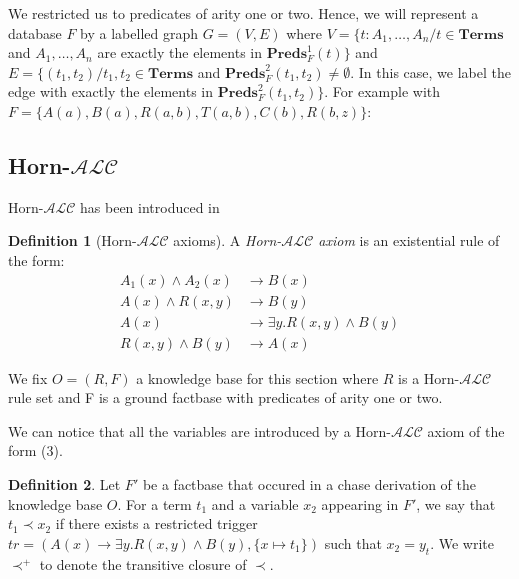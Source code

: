 \documentclass{article}
\theoremstyle{definition}
\newtheorem{definition}{Definition}[section]
\theoremstyle{remark}
\newcommand{\Terms}{\textbf{Terms}}
\newcommand{\Preds}{\textbf{Preds}}
\begin{document}
We restricted us to predicates of arity one or two. Hence, we will represent a database $F$ by a labelled graph $G = (V,E)$ where $V = \{t:A_1,\ldots,A_n /t \in \Terms$ and $A_1,\ldots,A_n$ are exactly the elements in $\Preds_F^1(t)\}$ and $E = \{(t_1,t_2) /t_1,t_2 \in \Terms$ and $\Preds^2_F(t_1,t_2) \neq \emptyset$. In this case, we label the edge with exactly the elements in $\Preds^2_F(t_1,t_2)\}$. For example with $F = \{A(a), B(a),R(a,b),T(a,b),C(b),R(b,z)\}$: \\



\subsection{Horn-$\mathcal{ALC}$ }

Horn-$\mathcal{ALC}$ has been introduced in \cite{Horn-ALC}

\begin{definition}[Horn-$\mathcal{ALC}$ axioms]
A \emph{Horn-$\mathcal{ALC}$ axiom} is an existential rule of the form:
\begin{align}
A_1(x) \wedge A_2(x) &\rightarrow B(x) \\
A(x) \wedge R(x,y) &\rightarrow B(y) \\
A(x) &\rightarrow \exists y.R(x,y) \wedge B(y) \\
R(x,y) \wedge B(y) &\rightarrow A(x)
\end{align}

\end{definition}


We fix $O=(R,F)$ a knowledge base for this section where $R$ is a Horn-$\mathcal{ALC}$ rule set and F is a ground factbase with predicates of arity one or two.

We can notice that all the variables are introduced by a Horn-$\mathcal{ALC}$ axiom of the form (3).

\begin{definition}
Let $F'$ be a factbase that occured in a chase derivation of the knowledge base $O$. For a term $t_1$ and a variable $x_2$ appearing in $F'$, we say that $t_1 \prec x_2$ if there exists a restricted trigger $tr = (A(x) \rightarrow \exists y.R(x,y) \wedge B(y), \{x \mapsto t_1\})$ such that $x_2 = y_t$. We write $\prec^+$ to denote the transitive closure of $\prec$.
\end{definition}
\end{document}
